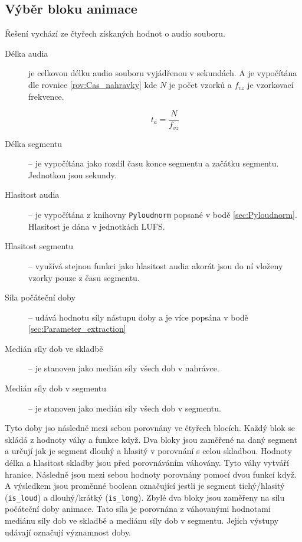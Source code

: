 \subsection{Výběr bloku animace} \label{sec:Vyber_bloku_animace}

Řešení vychází ze čtyřech získaných hodnot o audio souboru.

\begin{description}
    \item[Délka audia] je celkovou délku audio souboru vyjádřenou v sekundách. A je vypočítána dle rovnice \ref{rov:Cas_nahravky} kde $N$ je počet vzorků a $f_{vz}$ je vzorkovací frekvence. 

    \begin{equation}
        t_{a} = \frac{N}{f_{vz}}
        \label{rov:Cas_nahravky}
    \end{equation}

    \item[Délka segmentu] -- je vypočítána jako rozdíl času konce segmentu a začátku segmentu. Jednotkou jsou sekundy. 
    \item[Hlasitost audia] -- je vypočítána z knihovny \texttt{Pyloudnorm} popsané v bodě \ref{sec:Pyloudnorm}. Hlasitost je dána v jednotkách LUFS.
    \item[Hlasitost segmentu] -- využívá stejnou funkci jako hlasitost audia akorát jsou do ní vloženy vzorky pouze z času segmentu. 
    \item[Síla počáteční doby] -- udává hodnotu síly nástupu doby a je více popsána v bodě \ref{sec:Parameter_extraction}
    \item[Medián síly dob ve skladbě] -- je stanoven jako medián síly všech dob v nahrávce. 
    \item[Medián síly dob v segmentu] -- je stanoven jako medián  síly všech dob v segmentu. 
\end{description}
Tyto doby jso následně mezi sebou porovnány ve čtyřech blocích. Každý blok se skládá z hodnoty váhy a funkce když. Dva bloky jsou zaměřené na daný segment a určují jak je segment dlouhý a hlasitý v porovnání s celou skladbou. Hodnoty délka a hlasitost skladby jsou před porovnáváním váhovány. Tyto váhy vytváří hranice. Následně jsou mezi sebou hodnoty porovnány pomocí dvou funkcí když. A výsledkem jsou proměnné boolean označující jestli je segment tichý/hlasitý (\texttt{is\_loud}) a dlouhý/krátký (\texttt{is\_long}). Zbylé dva bloky jsou zaměřeny na sílu počáteční doby animace. Tato síla je porovnána z váhovanými hodnotami mediánu síly dob ve skladbě a mediánu síly dob v segmentu. Jejich výstupy udávají označují významnost doby. 


